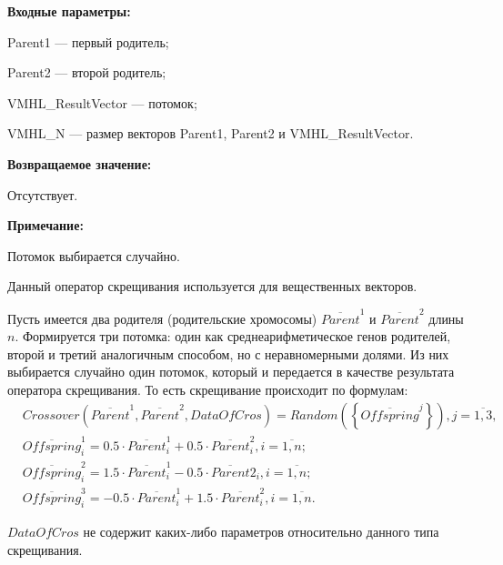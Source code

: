 \textbf{Входные параметры:}
 
Parent1 --- первый родитель;
 
Parent2 --- второй родитель;
 
VMHL\_ResultVector --- потомок;
 
VMHL\_N --- размер векторов Parent1, Parent2 и VMHL\_ResultVector.

\textbf{Возвращаемое значение:}

 Отсутствует.
 
\textbf{ Примечание:}

 Потомок выбирается случайно.
 
Данный оператор скрещивания используется для вещественных векторов.

Пусть имеется два родителя (родительские хромосомы) $ \overline{Parent}^1 $ и $ \overline{Parent}^2$ длины $n$. Формируется три потомка: один как среднеарифметическое генов родителей, второй и третий аналогичным способом, но с неравномерными долями.  Из них выбирается случайно один потомок, который и передается в качестве результата оператора скрещивания. То есть скрещивание происходит по формулам:
\begin{align}
\label{SetOfOperatorsAlgorithms:eq:LinearCrossoverForReal}
&Crossover \left( \overline{Parent}^1, \overline{Parent}^2, DataOfCros\right)=Random \left(\left\lbrace \overline{Offspring}^j\right\rbrace  \right), j=\overline{1,3}, \\
& \overline{Offspring}^1_i=0.5\cdot\overline{Parent}^1_i+0.5\cdot\overline{Parent}^2_i , i=\overline{1,n};\nonumber\\
&\overline{Offspring}^2_i=1.5\cdot\overline{Parent}^1_i-0.5\cdot\overline{Parent}2_i , i=\overline{1,n};\nonumber\\
&\overline{Offspring}^3_i=-0.5\cdot\overline{Parent}^1_i+1.5\cdot\overline{Parent}^2_i , i=\overline{1,n}.\nonumber
\end{align}

$ DataOfCros $ не содержит каких-либо параметров относительно данного типа скрещивания.